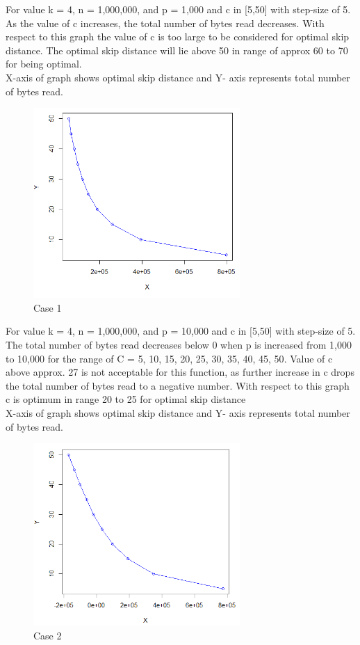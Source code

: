 \documentclass[12pt]{report}
\begin{document}
For value  k = 4, n = 1,000,000, and p = 1,000 and c in [5,50] with step-size of 5. As the value of c increases, the total number of bytes read decreases. With respect to this graph the value of c is too large to be considered for optimal skip distance. The optimal skip distance will lie above 50 in range of approx  60 to 70 for being optimal.  \\
X-axis of graph shows optimal skip distance and Y- axis represents   total number of bytes read.
\begin{figure}[ht] 
  \centering
  \includegraphics[width=0.7\textwidth]{Case1_514.PNG}
  \caption{Case 1}
  \label{fig:25}
\end{figure}

For value  k = 4, n = 1,000,000, and p = 10,000 and c in [5,50] with step-size of 5. The total number of bytes read decreases below 0 when p is increased from 1,000 to 10,000 for the range of C = {5, 10, 15, 20, 25, 30, 35, 40, 45, 50}. Value of c above approx. 27 is not acceptable for this function, as further increase in c drops the total number of bytes read to a negative number. With respect to this graph c is optimum in range 20 to 25 for optimal skip distance\\

X-axis of graph shows optimal skip distance and Y- axis represents   total number of bytes read.
\begin{figure}[ht] 
  \centering
  \includegraphics[width=0.7\textwidth]{Case2_514.PNG}
  \caption{Case 2}
  \label{fig:26}
\end{figure}
\end{document}
